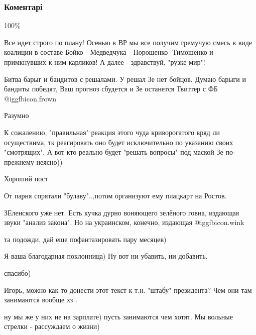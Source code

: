  
 
 
 
 
\subsubsection{Коментарі}

\begin{itemize} %
100\%

Все идет строго по плану! Осенью в ВР мы все получим гремучую смесь в виде коалиции в составе Бойко - Медведчука - Порошенко -Тимошенко и примкнувших к ним карликов! А далее - здравствуй, "рузке мир"!

Битва барыг и бандитов с решалами.
У решал Зе нет бойцов.
Думаю барыги и бандиты победят, Ваш прогноз сбудется и Зе останется Твиттер с ФБ  @igg{fbicon.frown} 

Разумно

К сожалению, "правильная" реакция этого чуда криворогатого вряд ли осуществима, тк реагировать оно будет исключительно по указанию своих "смотрящих". А вот кто реально будет "решать вопросы" под маской Зе по-прежнему неясно))

Хороший пост

От парня спрятали "булаву"..,потом организуют ему плацкарт на Ростов.

ЗЕленского уже нет. Есть кучка дурно воняющего зелёного говна, издающая звуки "анализ закона". Но на украинском, конечно, издающая  @igg{fbicon.wink} 

та подожди, дай еще пофантазировать пару месяцев)

Я ваша благодарная поклонница)
Ну вот ни убавить, ни добавить.

спасибо)

Игорь, можно как-то донести этот текст к т.н. "штабу" президента? Чем они там занимаются вообще хз .

\begin{itemize} %
ну мы же у них не на зарплате) пусть занимаются чем хотят. Мы вольные стрелки - рассуждаем о жизни)


\end{itemize}
\end{itemize}
